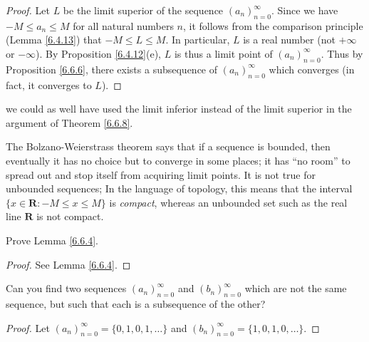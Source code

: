 \begin{proof}
    Let \(L\) be the limit superior of the sequence \((a_n)_{n = 0}^\infty\).
    Since we have \(-M \leq a_n \leq M\) for all natural numbers \(n\), it follows from the comparison principle (Lemma \ref{6.4.13}) that \(-M \leq L \leq M\).
    In particular, \(L\) is a real number (not \(+\infty\) or \(-\infty\)).
    By Proposition \ref{6.4.12}(e), \(L\) is thus a limit point of \((a_n)_{n = 0}^\infty\).
    Thus by Proposition \ref{6.6.6}, there exists a subsequence of \((a_n)_{n = 0}^\infty\) which converges
    (in fact, it converges to \(L\)).
\end{proof}

\begin{note}
    we could as well have used the limit inferior instead of the limit superior in the argument of Theorem \ref{6.6.8}.
\end{note}

\begin{remark}\label{6.6.9}
    The Bolzano-Weierstrass theorem says that if a sequence is bounded, then eventually it has no choice but to converge in some places;
    it has ``no room'' to spread out and stop itself from acquiring limit points.
    It is not true for unbounded sequences;
    In the language of topology, this means that the interval \(\{x \in \mathbf{R} : -M \leq x \leq M\}\) is \emph{compact}, whereas an unbounded set such as the real line \(\mathbf{R}\) is not compact.
\end{remark}

\exercisesection

\begin{exercise}\label{ex 6.6.1}
    Prove Lemma \ref{6.6.4}.
\end{exercise}

\begin{proof}
    See Lemma \ref{6.6.4}.
\end{proof}

\begin{exercise}\label{ex 6.6.2}
    Can you find two sequences \((a_n)_{n = 0}^\infty\) and \((b_n)_{n = 0}^\infty\) which are not the same sequence, but such that each is a subsequence of the other?
\end{exercise}

\begin{proof}
    Let \((a_n)_{n = 0}^\infty = \{0, 1, 0, 1, \dots\}\) and \((b_n)_{n = 0}^\infty = \{1, 0, 1, 0, \dots\}\).
\end{proof}

